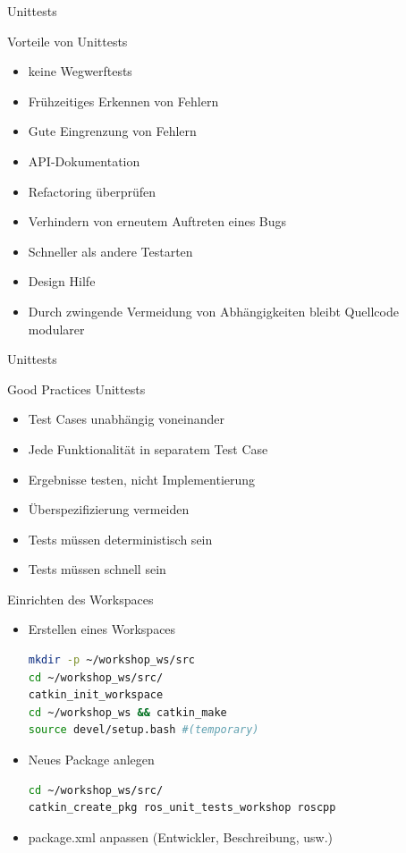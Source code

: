 \documentclass{beamer}
\begin{document}
\begin{frame}{Unittests}
	\begin{block}{Vorteile von Unittests}
	\begin{itemize}
		\item keine Wegwerftests
		\item Frühzeitiges Erkennen von Fehlern
		\item Gute Eingrenzung von Fehlern
		\item API-Dokumentation
		\item Refactoring überprüfen
		\item Verhindern von erneutem Auftreten eines Bugs
		\item Schneller als andere Testarten
		\item Design Hilfe
		\item Durch zwingende Vermeidung von Abhängigkeiten bleibt Quellcode modularer
	\end{itemize}
	\end{block}
\end{frame}

\begin{frame}{Unittests}
	\begin{block}{Good Practices Unittests}
	\begin{itemize}
		\item Test Cases unabhängig voneinander
		\item Jede Funktionalität in separatem Test Case
		\item Ergebnisse testen, nicht Implementierung
		\item Überspezifizierung vermeiden
		\item Tests müssen deterministisch sein
		\item Tests müssen schnell sein
	\end{itemize}
	\end{block}
\end{frame}

\begin{frame}[fragile]{Einrichten des Workspaces}
\begin{itemize}
\item Erstellen eines Workspaces
\begin{lstlisting}[language=bash]
mkdir -p ~/workshop_ws/src
cd ~/workshop_ws/src/
catkin_init_workspace
cd ~/workshop_ws && catkin_make
source devel/setup.bash #(temporary)
\end{lstlisting}
\pause
\item Neues Package anlegen
\begin{lstlisting}[language=bash]
cd ~/workshop_ws/src/
catkin_create_pkg ros_unit_tests_workshop roscpp
\end{lstlisting}
\item package.xml anpassen (Entwickler, Beschreibung, usw.)
\end{itemize}
\end{frame}
\end{document}

